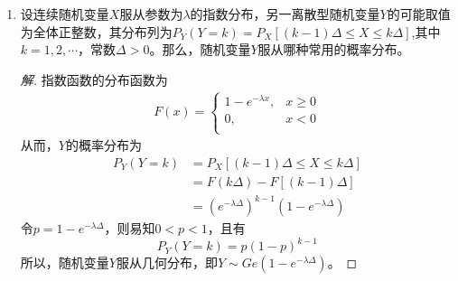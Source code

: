 \documentclass[12pt]{article}
\newcommand{\hei}{\CJKfamily{hei}}                          %
\begin{document}
\begin{enumerate}
\item {\hei 设连续随机变量$ X $服从参数为$ \lambda $的指数分布，另一离散型随机变量$ Y $的可能取值为全体正整数，其分布列为$ {{P}_{Y}}\left( Y=k \right)={{P}_{X}}\left[ \left( k-1 \right)\Delta \le X\le k\Delta  \right] $,其中$ k=1,2,\cdots $，常数$ \Delta >0 $。那么，随机变量$ Y $服从哪种常用的概率分布。}
\begin{proof}[解]
	指数函数的分布函数为
	\begin{equation}
		\begin{aligned}
			F\left( x \right)=\left\{ \begin{matrix}
			1-{{e}^{-\lambda x}},&x\ge 0  \\
			0,&x<0  \\
			\end{matrix} \right.
		\end{aligned}
	\end{equation}
	从而，$ Y $的概率分布为
	\begin{equation}
		\begin{aligned}
			 {{P}_{Y}}\left( Y=k \right)& ={{P}_{X}}\left[ \left( k-1 \right)\Delta \le X\le k\Delta  \right] \\ 
			& =F\left( k\Delta  \right)-F\left[ \left( k-1 \right)\Delta  \right] \\ 
			& ={{\left( {{e}^{-\lambda \Delta }} \right)}^{k-1}}\left( 1-{{e}^{-\lambda \Delta }} \right)
		\end{aligned}
	\end{equation}
	令$ p=1-{{e}^{-\lambda \Delta }} $，则易知$ 0<p<1 $，且有
	\begin{equation}
		{{P}_{Y}}\left( Y=k \right)=p{{\left( 1-p \right)}^{k-1}}
	\end{equation}
	所以，随机变量$ Y $服从几何分布，即$ Y\sim Ge\left( 1-{{e}^{-\lambda \Delta }} \right) $。
\end{proof}



\end{enumerate}
\end{document}
